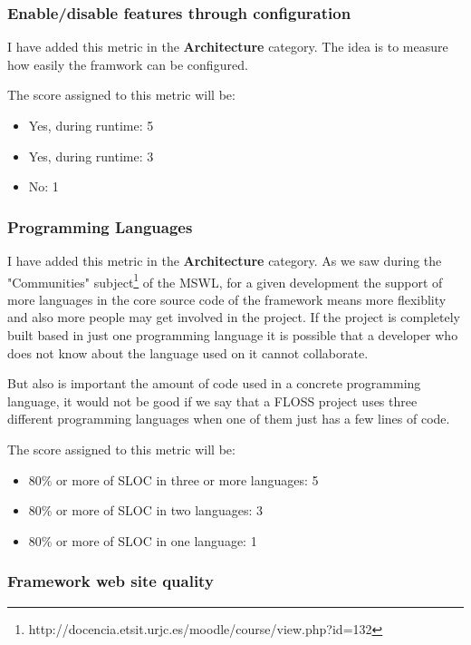 \documentclass[a4paper,12pt]{book}
\begin{document}
\subsubsection{Enable/disable features through configuration}
\label{Enable/disable features through configuration}

I have added this metric in the \textbf{Architecture} category. The idea is to measure how easily the framwork can be configured.

The score assigned to this metric will be:
\begin{itemize}
 \item Yes, during runtime: 5
 \item Yes, during runtime: 3
 \item No: 1
\end{itemize}

\subsubsection{Programming Languages}
\label{Programming Languages}

I have added this metric in the \textbf{Architecture} category. As we saw during the "Communities" subject\footnote{http://docencia.etsit.urjc.es/moodle/course/view.php?id=132}  of the MSWL, for a given development the support of more languages in the core source code of the framework means more flexiblity and also more people may get involved in the project. If the project is completely built based in just one programming language it is possible that a developer who does not know about the language used on it cannot collaborate.

But also is important the amount of code used in a concrete programming language, it would not be good if we say that a FLOSS project uses three different programming languages when one of them just has a few lines of code.

The score assigned to this metric will be:
\begin{itemize}
 \item 80\% or more of SLOC in three or more languages: 5
 \item 80\% or more of SLOC in two languages: 3
 \item 80\% or more of SLOC in one language: 1
\end{itemize}

\subsubsection{Framework web site quality}
\label{Framework web site quality}
\end{document}
